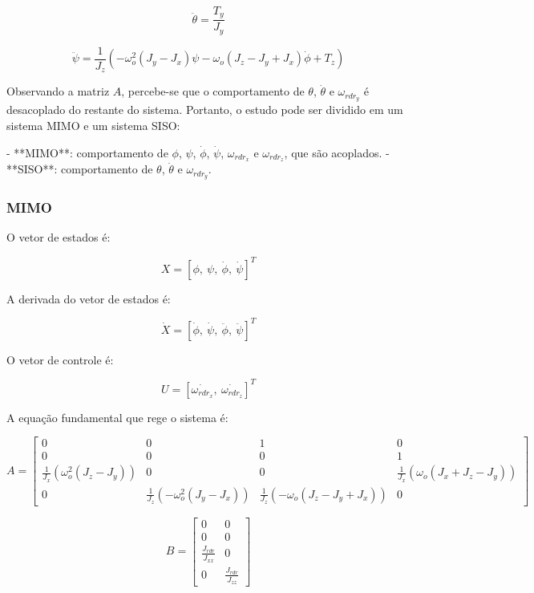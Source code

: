 \begin{equation}
\ddot{\theta}=\frac{T_y}{J_y}
\end{equation}

\begin{equation}
\ddot{\psi}=\frac{1}{J_z}(-\omega_o^2(J_y-J_x)\psi-\omega_o(J_z-J_y+J_x)\dot{\phi}+T_z)
\end{equation}

Observando a matriz \( A \), percebe-se que o comportamento de \( \theta \), \( \dot{\theta} \) e \( \omega_{{rdr}_y} \) é desacoplado do restante do sistema. Portanto, o estudo pode ser dividido em um sistema MIMO e um sistema SISO:

- **MIMO**: comportamento de \( \phi \), \( \psi \), \( \dot{\phi} \), \( \dot{\psi} \), \( \omega_{{rdr}_x} \) e \( \omega_{{rdr}_z} \), que são acoplados.
- **SISO**: comportamento de \( \theta \), \( \dot{\theta} \) e \( \omega_{{rdr}_y} \).

\subsubsection{MIMO}

O vetor de estados é:

$$
X = [\phi, \: \psi, \: \dot{\phi}, \: \dot{\psi}]^T
$$

A derivada do vetor de estados é:

$$
\dot{X} = [\dot{\phi}, \: \dot{\psi}, \: \ddot{\phi}, \: \ddot{\psi}]^T
$$

O vetor de controle é:

$$
U = [\dot{\omega_{rdr_x}}, \: \dot{\omega_{rdr_z}}]^T
$$

A equação fundamental que rege o sistema é:

$$
A = \begin{bmatrix}
	0 & 0 & 1 & 0 \\
	0 & 0 & 0 & 1 \\
	\frac{1}{J_x}(\omega_o^2(J_z-J_y)) & 0 & 0 & \frac{1}{J_x}(\omega_o(J_x+J_z-J_y)) \\
	0 & \frac{1}{J_z}(-\omega_o^2(J_y-J_x)) & \frac{1}{J_z}(-\omega_o(J_z-J_y+J_x)) & 0
\end{bmatrix}
$$

$$
B = \begin{bmatrix}
	0 & 0 \\
	0 & 0 \\
	\frac{J_{rdr}}{J_{xx}} & 0 \\
	0 & \frac{J_{rdr}}{J_{zz}}
\end{bmatrix}
$$

